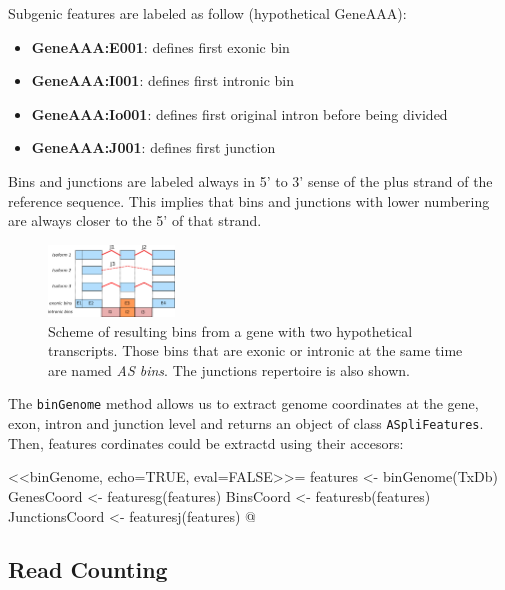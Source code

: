 \documentclass{article}
\begin{document}
Subgenic features are labeled as follow (hypothetical GeneAAA):
\begin{itemize}
\item \textbf{GeneAAA:E001}: defines first exonic bin
\item \textbf{GeneAAA:I001}: defines first intronic bin
\item \textbf{GeneAAA:Io001}: defines first original intron before being divided
\item \textbf{GeneAAA:J001}: defines first junction
\end{itemize}

Bins and junctions are labeled always in  5' to 3' sense of the plus strand of
the reference sequence. This implies that  bins and junctions with lower 
numbering are always closer to the 5' of that strand.
  
\begin{figure}[ht!]
\centering
\includegraphics[width=0.3\textwidth]{binDefinition.png}
\caption{Scheme of resulting bins from a gene with two hypothetical transcripts. 
Those bins that are exonic or intronic at the same time are named \textit{AS
bins}. The junctions repertoire is also shown.
}
\label{fig:binDefinition}
\end{figure}

The \texttt{binGenome} method allows us to  extract genome coordinates at the 
gene, exon, intron and junction level and returns an object of class 
\texttt{ASpliFeatures}. Then, features cordinates could be extractd using their 
accesors:

<<binGenome, echo=TRUE, eval=FALSE>>=
features <- binGenome(TxDb) 
GenesCoord <- featuresg(features)
BinsCoord <- featuresb(features)
JunctionsCoord <- featuresj(features)
@

\subsection{Read Counting} 
\end{document}
